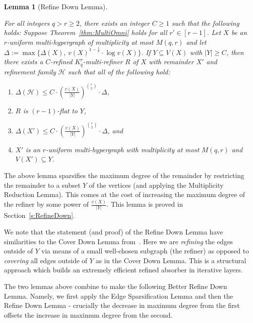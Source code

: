 \documentclass[11pt]{article}
\newcounter{i}
\theoremstyle{plain}
\newtheorem{lem}[thm]{Lemma}
\theoremstyle{plain} %
\theoremstyle{definition}
\begin{document}
\begin{lem}[Refine Down Lemma]\label{lem:RefineDown}

For all integers $q > r\ge 2$, there exists an integer $C \ge 1$ such that the following holds: Suppose Theorem~\ref{thm:MultiOmni} holds for all $r'\in [r-1]$.  Let $X$ be an $r$-uniform multi-hypergraph of multiplicity at most $M(q,r)$ and let $\Delta:= \max \{\Delta(X),~ v(X)^{1-\frac{1}{r}}\cdot \log v(X)\}$. If $Y\subseteq V(X)$ with $|Y|\ge C$, then there exists a $C$-refined $K_q^r$-multi-refiner $R$ of $X$ with remainder $X'$ and refinement family $\mathcal{H}$ such that all of the following hold:

\begin{enumerate}
    \item[(1)] $\Delta(\mathcal{H}) \le C \cdot  \left(\frac{v(X)}{|Y|}\right)^{\binom{r}{2}} \cdot \Delta$,
    \item[(2)] $R$ is $(r-1)$-flat to $Y$,
    \item[(3)] $\Delta(X')\le C \cdot  \left(\frac{v(X)}{|Y|}\right)^{\binom{r}{2}} \cdot \Delta$, and
    \item[(4)] $X'$ is an $r$-uniform multi-hypergraph with multiplicity at most $M(q,r)$  and $V(X') \subseteq Y$.
\end{enumerate}      
\end{lem}

The above lemma sparsifies the maximum degree of the remainder by restricting the remainder to a subset $Y$ of the vertices (and applying the Multiplicity Reduction Lemma). This comes at the cost of increasing the maximum degree of the refiner by some power of $\frac{v(X)}{|Y|}$. This lemma is proved in Section~\ref{s:RefineDown}.

We note that the statement (and proof) of the Refine Down Lemma have similarities to the Cover Down Lemma from~\cite{GKLO16}. Here we are \emph{refining} the edges outside of $Y$ via means of a small well-chosen subgraph (the refiner) as opposed to \emph{covering} all edges outside of $Y$ as in the Cover Down Lemma. This is a structural approach which builds an extremely efficient refined absorber in iterative layers.


The two lemmas above combine to make the following Better Refine Down Lemma. Namely, we first apply the Edge Sparsification Lemma and then the Refine Down Lemma - crucially the decrease in maximum degree from the first offsets the increase in maximum degree from the second.
\end{document}
